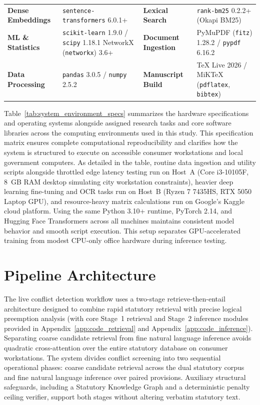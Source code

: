 \begin{table}[!htbp]
\begin{tabularx}{\linewidth}{>{\RaggedRight}p{2.4cm}>{\RaggedRight}p{3.9cm}>{\RaggedRight}p{2.8cm}>{\RaggedRight}X}
            \textbf{Dense Embeddings} & \texttt{sentence-transformers} 6.0.1+ & \textbf{Lexical Search} & \texttt{rank-bm25} 0.2.2+ (Okapi BM25) \\
            \textbf{ML \& Statistics} & \texttt{scikit-learn} 1.9.0 / \texttt{scipy} 1.18.1 \newline NetworkX (\texttt{networkx}) 3.6+ & \textbf{Document Ingestion} & PyMuPDF (\texttt{fitz}) 1.28.2 / \texttt{pypdf} 6.16.2 \\
            \textbf{Data Processing} & \texttt{pandas} 3.0.5 / \texttt{numpy} 2.5.2 & \textbf{Manuscript Build} & TeX Live 2026 / MiKTeX (\texttt{pdflatex}, \texttt{bibtex}) \\
            \bottomrule
        \end{tabularx}
    \end{table}

    Table~\ref{tab:system_environment_specs} summarizes the hardware specifications and operating systems alongside assigned research tasks and core software libraries across the computing environments used in this study. This specification matrix ensures complete computational reproducibility and clarifies how the system is structured to execute on accessible consumer workstations and local government computers. As detailed in the table, routine data ingestion and utility scripts alongside throttled edge latency testing run on Host~A (Core i3-10105F, 8~GB RAM desktop simulating city workstation constraints), heavier deep learning fine-tuning and OCR tasks run on Host~B (Ryzen 7 7435HS, RTX 5050 Laptop GPU), and resource-heavy matrix calculations run on Google's Kaggle cloud platform. Using the same Python 3.10+ runtime, PyTorch 2.14, and Hugging Face Transformers across all machines maintains consistent model behavior and smooth script execution. This setup separates GPU-accelerated training from modest CPU-only office hardware during inference testing.

    \section{Pipeline Architecture}
    \label{sec:pipeline_architecture}
    The live conflict detection workflow uses a two-stage retrieve-then-entail architecture designed to combine rapid statutory retrieval with precise logical preemption analysis (with core Stage~1 retrieval and Stage~2 inference modules provided in Appendix~\ref{app:code_retrieval} and Appendix~\ref{app:code_inference}). Separating coarse candidate retrieval from fine natural language inference avoids quadratic cross-attention over the entire statutory database on consumer workstations. The system divides conflict screening into two sequential operational phases: coarse candidate retrieval across the dual statutory corpus and fine natural language inference over paired provisions. Auxiliary structural safeguards, including a Statutory Knowledge Graph and a deterministic penalty ceiling verifier, support both stages without altering verbatim statutory text.

